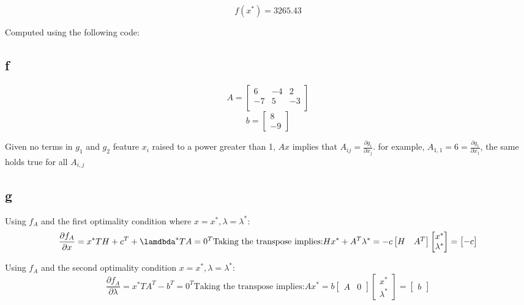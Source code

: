\documentclass[10pt]{article}
\begin{document}
\[
f(x^*) = 3265.43
\]

Computed using the following code:


\subsection{f}
\[
A = 
\begin{bmatrix}
6 & -4 & 2 \\
-7 & 5 & -3\\
\end{bmatrix}
\]
\[
b = 
\begin{bmatrix}
  8 \\
  -9
\end{bmatrix}
\]

Given no terms in $g_1$ and $g_2$ feature $x_i$ raised to a power greater than 1, $Ax$ implies that $A_{ij} = \frac{\partial g_i}{\partial x_j}.$ for example, $A_{1,1} = 6 = \frac{\partial g_1}{\partial x_1}$, the same holds true for all $A_{i,j}$

\subsection{g}

Using $f_A$ and the first optimality condition where $x = x^*, \lambda = \lambda^*$:
\[
\frac{\partial f_A}{\partial x} = x^*T H + c^T + \lamdbda^*T A = 0^T
\text{Taking the transpose implies:}
Hx^* + A^T \lambda^* = -c

\begin{bmatrix}
    H & A^T
    \end{bmatrix}
    \begin{bmatrix}
    x^* \\
    \lambda^*
    \end{bmatrix}
    =
    \begin{bmatrix}
    -c
\end{bmatrix}
\]

Using $f_A$ and the second optimality condition $x = x^*, \lambda = \lambda^*$:
\[
\frac{\partial f_A}{\partial \lambda} = x^*T A^T - b^T = 0^T
\text{Taking the transpose implies:}
Ax^* = b

\begin{bmatrix}
    A & 0    
    \end{bmatrix}
    \begin{bmatrix}
    x^* \\
    \lambda^*
    \end{bmatrix}
    =
    \begin{bmatrix}
    b
\end{bmatrix}

\]
\end{document}

